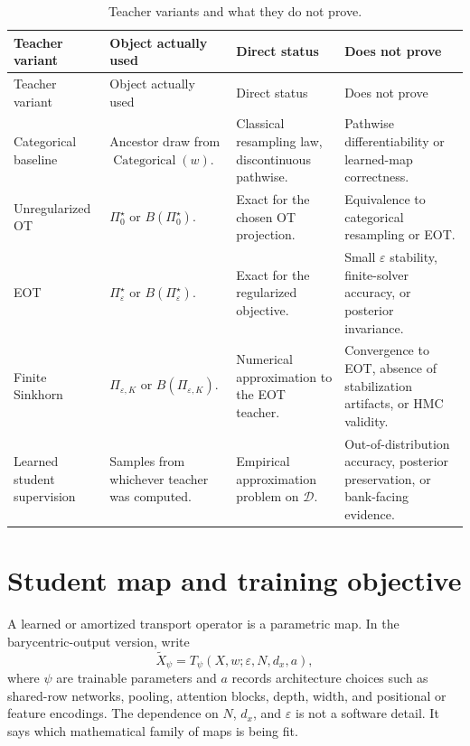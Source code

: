 \begin{longtable}{@{}p{} p{} p{} p{}@{}}
\caption{Teacher variants and what they do not prove.}
\label{tab:bf-learned-ot-teacher-variants}\\
\toprule
Teacher variant & Object actually used & Direct status & Does not prove \\
\midrule
\endfirsthead
\toprule
Teacher variant & Object actually used & Direct status & Does not prove \\
\midrule
\endhead
Categorical baseline &
Ancestor draw from $\operatorname{Categorical}(w)$. &
Classical resampling law, discontinuous pathwise. &
Pathwise differentiability or learned-map correctness. \\
Unregularized OT &
$\Pi_0^\star$ or $B(\Pi_0^\star)$. &
Exact for the chosen OT projection. &
Equivalence to categorical resampling or EOT. \\
EOT &
$\Pi_\varepsilon^\star$ or $B(\Pi_\varepsilon^\star)$. &
Exact for the regularized objective. &
Small $\varepsilon$ stability, finite-solver accuracy, or posterior invariance. \\
Finite Sinkhorn &
$\Pi_{\varepsilon,K}$ or $B(\Pi_{\varepsilon,K})$. &
Numerical approximation to the EOT teacher. &
Convergence to EOT, absence of stabilization artifacts, or HMC validity. \\
Learned student supervision &
Samples from whichever teacher was computed. &
Empirical approximation problem on $\mathcal D$. &
Out-of-distribution accuracy, posterior preservation, or bank-facing evidence. \\
\bottomrule
\end{longtable}

\section{Student map and training objective}
\label{sec:bf-learned-ot-teacher}

A learned or amortized transport operator is a parametric map.  In the
barycentric-output version, write
\begin{equation}
\label{eq:bf-learned-ot-student-map}
  \tilde X_\psi
  =
  T_\psi(X,w;\varepsilon,N,d_x,a),
\end{equation}
where $\psi$ are trainable parameters and $a$ records architecture choices such
as shared-row networks, pooling, attention blocks, depth, width, and positional
or feature encodings.  The dependence on $N$, $d_x$, and $\varepsilon$ is not a
software detail.  It says which mathematical family of maps is being fit.

